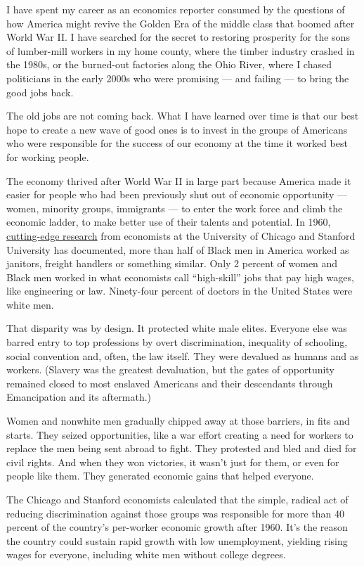 I have spent my career as an economics reporter consumed by the
questions of how America might revive the Golden Era of the middle class
that boomed after World War II. I have searched for the secret to
restoring prosperity for the sons of lumber-mill workers in my home
county, where the timber industry crashed in the 1980s, or the
burned-out factories along the Ohio River, where I chased politicians in
the early 2000s who were promising --- and failing --- to bring the good
jobs back.

The old jobs are not coming back. What I have learned over time is that
our best hope to create a new wave of good ones is to invest in the
groups of Americans who were responsible for the success of our economy
at the time it worked best for working people.

The economy thrived after World War II in large part because America
made it easier for people who had been previously shut out of economic
opportunity --- women, minority groups, immigrants --- to enter the work
force and climb the economic ladder, to make better use of their talents
and potential. In 1960, \href{http://klenow.com/HHJK.pdf}{cutting-edge
research} from economists at the University of Chicago and Stanford
University has documented, more than half of Black men in America worked
as janitors, freight handlers or something similar. Only 2 percent of
women and Black men worked in what economists call ``high-skill'' jobs
that pay high wages, like engineering or law. Ninety-four percent of
doctors in the United States were white men.

That disparity was by design. It protected white male elites. Everyone
else was barred entry to top professions by overt discrimination,
inequality of schooling, social convention and, often, the law itself.
They were devalued as humans and as workers. (Slavery was the greatest
devaluation, but the gates of opportunity remained closed to most
enslaved Americans and their descendants through Emancipation and its
aftermath.)

Women and nonwhite men gradually chipped away at those barriers, in fits
and starts. They seized opportunities, like a war effort creating a need
for workers to replace the men being sent abroad to fight. They
protested and bled and died for civil rights. And when they won
victories, it wasn't just for them, or even for people like them. They
generated economic gains that helped everyone.

The Chicago and Stanford economists calculated that the simple, radical
act of reducing discrimination against those groups was responsible for
more than 40 percent of the country's per-worker economic growth after
1960. It's the reason the country could sustain rapid growth with low
unemployment, yielding rising wages for everyone, including white men
without college degrees.

